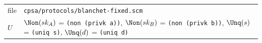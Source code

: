 \par\smallskip\noindent\begin{tabular}{@{}l p{}@{}}
file & \texttt{cpsa/protocols/blanchet-fixed.scm}\\
$U$ & $\Non(sk_A)$ = \texttt{(non (privk a))}, $\Non(sk_B)$ = \texttt{(non (privk b))}, $\Unq(s)$ = \texttt{(uniq s)}, $\Unq(d)$ = \texttt{(uniq d)}\\
\end{tabular}

